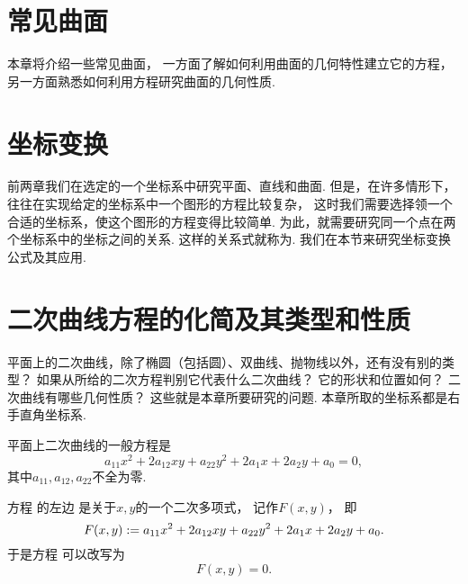 \chapter{常见曲面}
本章将介绍一些常见曲面，
一方面了解如何利用曲面的几何特性建立它的方程，
另一方面熟悉如何利用方程研究曲面的几何性质.







\chapter{坐标变换}
前两章我们在选定的一个坐标系中研究平面、直线和曲面.
但是，在许多情形下，往往在实现给定的坐标系中一个图形的方程比较复杂，
这时我们需要选择领一个合适的坐标系，使这个图形的方程变得比较简单.
为此，就需要研究同一个点在两个坐标系中的坐标之间的关系.
这样的关系式就称为.
我们在本节来研究坐标变换公式及其应用.







\chapter{二次曲线方程的化简及其类型和性质}
\begingroup
平面上的二次曲线，除了椭圆（包括圆）、双曲线、抛物线以外，还有没有别的类型？
如果从所给的二次方程判别它代表什么二次曲线？
它的形状和位置如何？
二次曲线有哪些几何性质？
这些就是本章所要研究的问题.
本章所取的坐标系都是右手直角坐标系.

平面上二次曲线的一般方程是\begin{equation}\label{equation:二次曲线方程.平面二次曲线的一般方程}
	a_{11} x^2 + 2 a_{12} x y + a_{22} y^2
	+ 2 a_1 x + 2 a_2 y + a_0 = 0,
\end{equation}
其中\(a_{11},a_{12},a_{22}\)不全为零.

方程  的左边
是关于\(x,y\)的一个二次多项式，
记作\(F(x,y)\)，
即\begin{equation*}
	F(x,y)
	:=
	a_{11} x^2 + 2 a_{12} x y + a_{22} y^2
	+ 2 a_1 x + 2 a_2 y + a_0.
\end{equation*}
于是方程  可以改写为\begin{equation*}
	F(x,y) = 0.
\end{equation*}

